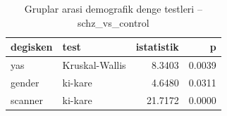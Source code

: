 \begin{table}[htbp]
  \centering
  \caption{Gruplar arasi demografik denge testleri -- schz\_vs\_control}
  \label{tab:balance_schz_vs_control}
  \small
  \begin{tabular}{llrr}
    \toprule
    degisken & test & istatistik & p \\
    \midrule
    yas & Kruskal-Wallis & 8.3403 & 0.0039 \\
    gender & ki-kare & 4.6480 & 0.0311 \\
    scanner & ki-kare & 21.7172 & 0.0000 \\
    \bottomrule
  \end{tabular}
\end{table}
